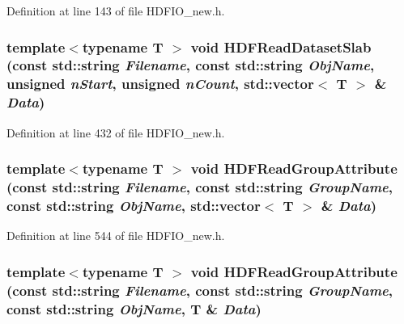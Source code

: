 Definition at line 143 of file HDFIO\_\-new.h.

\subsubsection[{HDFReadDatasetSlab}]{\setlength{\rightskip}{0pt plus 5cm}template$<$typename T $>$ void HDFReadDatasetSlab (const std::string {\em Filename}, \/  const std::string {\em ObjName}, \/  unsigned {\em nStart}, \/  unsigned {\em nCount}, \/  std::vector$<$ T $>$ \& {\em Data})}\label{HDFIO__new_8h_ac10c67494671661d5466ff2258154c8a}


Definition at line 432 of file HDFIO\_\-new.h.

\subsubsection[{HDFReadGroupAttribute}]{\setlength{\rightskip}{0pt plus 5cm}template$<$typename T $>$ void HDFReadGroupAttribute (const std::string {\em Filename}, \/  const std::string {\em GroupName}, \/  const std::string {\em ObjName}, \/  std::vector$<$ T $>$ \& {\em Data})}\label{HDFIO__new_8h_aa73c5851b1f8ae24364803f9578b1d8f}


Definition at line 544 of file HDFIO\_\-new.h.

\subsubsection[{HDFReadGroupAttribute}]{\setlength{\rightskip}{0pt plus 5cm}template$<$typename T $>$ void HDFReadGroupAttribute (const std::string {\em Filename}, \/  const std::string {\em GroupName}, \/  const std::string {\em ObjName}, \/  T \& {\em Data})}\label{HDFIO__new_8h_ab2ce05626da8d9a7d059795c4d5f02cc}


